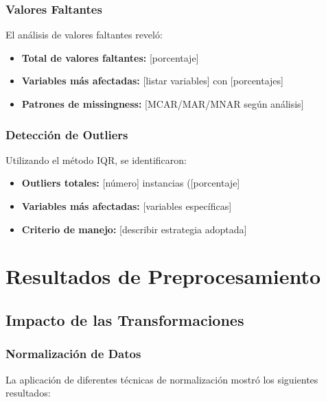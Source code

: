 \subsubsection{Valores Faltantes}

El análisis de valores faltantes reveló:

\begin{itemize}
    \item \textbf{Total de valores faltantes:} [porcentaje]%
    \item \textbf{Variables más afectadas:} [listar variables] con [porcentajes]%
    \item \textbf{Patrones de missingness:} [MCAR/MAR/MNAR según análisis]
\end{itemize}

\subsubsection{Detección de Outliers}

Utilizando el método IQR, se identificaron:

\begin{itemize}
    \item \textbf{Outliers totales:} [número] instancias ([porcentaje]%
    \item \textbf{Variables más afectadas:} [variables específicas]
    \item \textbf{Criterio de manejo:} [describir estrategia adoptada]
\end{itemize}

\section{Resultados de Preprocesamiento}

\subsection{Impacto de las Transformaciones}

\subsubsection{Normalización de Datos}

La aplicación de diferentes técnicas de normalización mostró los siguientes resultados:


